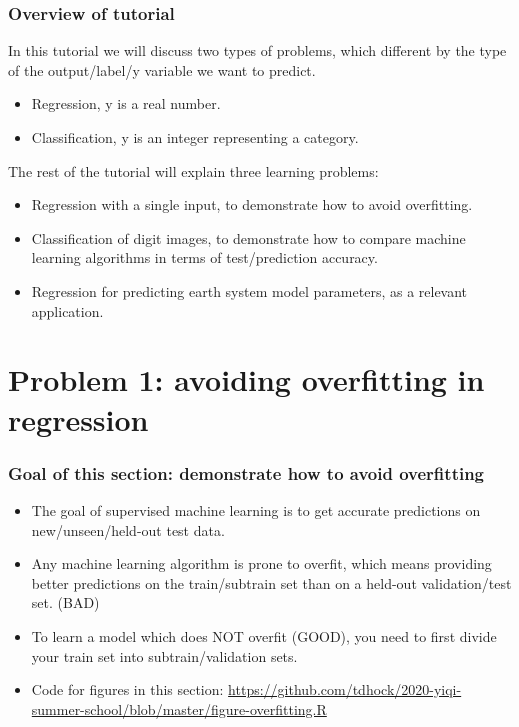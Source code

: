 \documentclass{beamer}
\begin{document}
\begin{frame}
  \frametitle{Overview of tutorial}
  In this tutorial we will discuss two types of problems, which
  different by the type of the output/label/y variable we want to predict.
  \begin{itemize}
  \item Regression, y is a real number.
  \item Classification, y is an integer representing a category.
  \end{itemize}

  The rest of the tutorial will explain three learning problems:
  \begin{itemize}
  \item Regression with a single input, to demonstrate how to avoid
    overfitting.
  \item Classification of digit images, to demonstrate how to compare
    machine learning algorithms in terms of test/prediction accuracy.
  \item Regression for predicting earth system model parameters, as a
    relevant application.
  \end{itemize}
\end{frame}

\section{Problem 1: avoiding overfitting in regression}
 
\begin{frame}
  \frametitle{Goal of this section: demonstrate how to avoid
    overfitting}
  \begin{itemize}
  \item The goal of supervised machine learning is to get accurate
    predictions on new/unseen/held-out test data.
  \item Any machine learning algorithm is prone to overfit, which
    means providing better predictions on the train/subtrain set than
    on a held-out validation/test set. (BAD)
  \item To learn a model which does NOT overfit (GOOD), you need to
    first divide your train set into subtrain/validation sets.
  \item Code for figures in this section:
    \url{https://github.com/tdhock/2020-yiqi-summer-school/blob/master/figure-overfitting.R}
  \end{itemize}
\end{frame}
\end{document}
